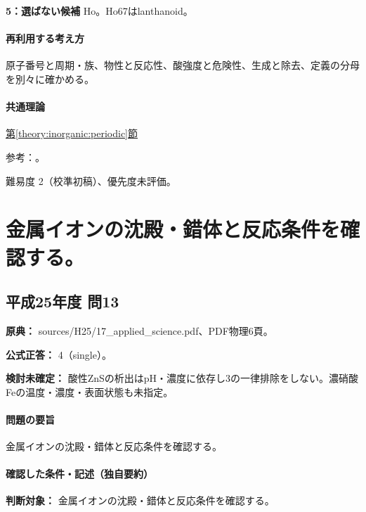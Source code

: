 \noindent\textbf{5：選ばない候補} Ho。Ho67はlanthanoid。\par

\paragraph{再利用する考え方} 原子番号と周期・族、物性と反応性、酸強度と危険性、生成と除去、定義の分母を別々に確かめる。

\paragraph{共通理論} \hyperref[theory:inorganic:periodic]{第\ref*{theory:inorganic:periodic}節}

\par 参考：\cite{atomic_nist2019}。

\par 難易度 2（校準初稿）、優先度未評価。

\section{金属イオンの沈殿・錯体と反応条件を確認する。}

\subsection{平成25年度 問13}
\label{q:h25-reg-applied-13}

\noindent\textbf{原典：} sources/H25/17\_applied\_science.pdf、PDF物理6頁。

\textbf{公式正答：} 4（single）。

\par\textbf{検討未確定：} 酸性ZnSの析出はpH・濃度に依存し3の一律排除をしない。濃硝酸Feの温度・濃度・表面状態も未指定。

\paragraph{問題の要旨} 金属イオンの沈殿・錯体と反応条件を確認する。

\paragraph{確認した条件・記述（独自要約）}\mbox{}\par

\noindent\textbf{判断対象：} 金属イオンの沈殿・錯体と反応条件を確認する。\par

